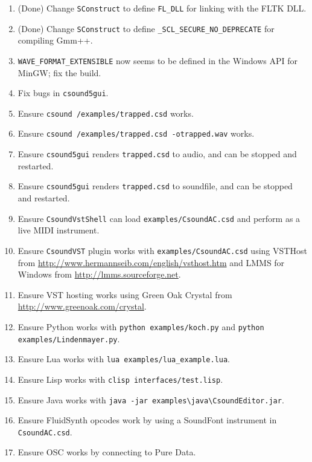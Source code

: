\documentclass[11pt,letterpaper,onecolumn]{scrartcl}
\begin{document}
\begin{sloppypar}
\begin{enumerate}
	\item (Done) Change \texttt{SConstruct} to define \verb|FL_DLL| for linking with the FLTK DLL.
	\item (Done) Change \texttt{SConstruct} to define \verb|_SCL_SECURE_NO_DEPRECATE| for compiling Gmm++.
	\item \verb|WAVE_FORMAT_EXTENSIBLE| now seems to be defined in the Windows API for MinGW; fix the build.
	\item Fix bugs in \texttt{csound5gui}.
	\item Ensure \texttt{csound /examples/trapped.csd} works.
	\item Ensure \texttt{csound /examples/trapped.csd -otrapped.wav} works.
	\item Ensure \texttt{csound5gui} renders \texttt{trapped.csd} to audio, and can be stopped and restarted.
	\item Ensure \texttt{csound5gui} renders \texttt{trapped.csd} to soundfile, and can be stopped and restarted.
	\item Ensure \texttt{CsoundVstShell} can load \texttt{examples/CsoundAC.csd} and perform as a live MIDI instrument.
	\item Ensure \texttt{CsoundVST} plugin works with \texttt{examples/CsoundAC.csd} using VSTHost from \url{http://www.hermannseib.com/english/vsthost.htm} and LMMS for Windows from \url{http://lmms.sourceforge.net}.
	\item Ensure VST hosting works using Green Oak Crystal from \url{http://www.greenoak.com/crystal}.
	\item Ensure Python works with \texttt{python examples/koch.py} and \texttt{python examples/Lindenmayer.py}.
	\item Ensure Lua works with \verb|lua examples/lua_example.lua|.
	\item Ensure Lisp works with \verb|clisp interfaces/test.lisp|.
	\item Ensure Java works with \verb|java -jar examples\java\CsoundEditor.jar|.
	\item Ensure FluidSynth opcodes work by using a SoundFont instrument in \texttt{CsoundAC.csd}.
	\item Ensure OSC works by connecting to Pure Data.
\end{enumerate}

\end{sloppypar}
\end{document}
